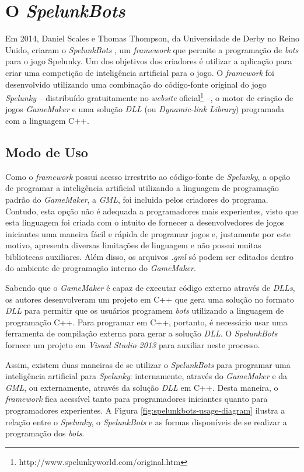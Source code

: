 \section{\label{section:spelunkbots}O \textit{SpelunkBots}}
Em 2014, Daniel Scales e Thomas Thompson, da Universidade de Derby no Reino
Unido, criaram o \textit{SpelunkBots} \cite{SPELUNKBOTSPAPER}, um
\textit{framework} que permite a programação de \textit{bots} para o jogo
Spelunky. Um dos objetivos dos criadores é utilizar a aplicação para criar uma
competição de inteligência artificial para o jogo. O \textit{framework} foi
desenvolvido utilizando uma combinação do código-fonte original do jogo
\textit{Spelunky} -- distribuído gratuitamente no \textit{website}
oficial\footnote{http://www.spelunkyworld.com/original.htm} --, o motor de
criação de jogos \textit{GameMaker} e uma solução \textit{DLL} (ou
\textit{Dynamic-link Library}) programada com a linguagem C++.


\subsection{\label{section:spelunkbots-usage}Modo de Uso}
Como o \textit{framework} possui acesso irrestrito ao código-fonte de
\textit{Spelunky}, a opção de programar a inteligência artificial utilizando a
linguagem de programação padrão do \textit{GameMaker}, a \textit{GML}, foi
incluida pelos criadores do programa. Contudo, esta opção não é adequada a
programadores mais experientes, visto que esta linguagem foi criada com o
intuito de fornecer a desenvolvedores de jogos iniciantes uma maneira fácil e
rápida de programar jogos e, justamente por este motivo, apresenta diversas
limitações de linguagem e não possui muitas bibliotecas auxiliares.  Além disso,
os arquivos \textit{.gml} só podem ser editados dentro do ambiente de
programação interno do \textit{GameMaker}.

Sabendo que o \textit{GameMaker} é capaz de executar código externo através de
\textit{DLLs}, os autores desenvolveram um projeto em C++ que gera uma solução
no formato \textit{DLL} para permitir que os usuários programem \textit{bots}
utilizando a linguagem de programação C++. Para programar em C++, portanto,  é
necessário usar uma ferramenta de compilação externa para gerar a solução
\textit{DLL}. O \textit{SpelunkBots} fornece um projeto em \textit{Visual Studio
2013} para auxiliar neste processo.

Assim, existem duas maneiras de se utilizar o \textit{SpelunkBots} para
programar uma inteligência artificial para \textit{Spelunky}: internamente,
através do \textit{GameMaker} e da \textit{GML}, ou externamente, através da
solução \textit{DLL} em C++. Desta maneira, o \textit{framework} fica acessível
tanto para programadores iniciantes quanto para programadores experientes.  A
Figura \ref{fig:spelunkbots-usage-diagram} ilustra a relação entre o
\textit{Spelunky}, o \textit{SpelunkBots} e as formas disponíveis de se realizar
a programação dos \textit{bots}.


